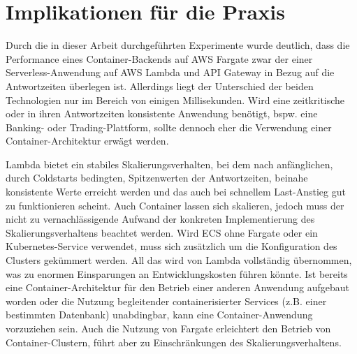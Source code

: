 \section{Implikationen für die Praxis}
Durch die in dieser Arbeit durchgeführten Experimente wurde deutlich, dass die Performance eines Container-Backends auf AWS Fargate zwar der einer Serverless-Anwendung auf AWS Lambda und API Gateway in Bezug auf die Antwortzeiten überlegen ist. Allerdings liegt der Unterschied der beiden Technologien nur im Bereich von einigen Millisekunden. Wird eine zeitkritische oder in ihren Antwortzeiten konsistente Anwendung benötigt, bspw. eine Banking- oder Trading-Plattform, sollte dennoch eher die Verwendung einer Container-Architektur erwägt werden.

Lambda bietet ein stabiles Skalierungsverhalten, bei dem nach anfänglichen, durch Coldstarts bedingten, Spitzenwerten der Antwortzeiten, beinahe konsistente Werte erreicht werden und das auch bei schnellem Last-Anstieg gut zu funktionieren scheint. Auch Container lassen sich skalieren, jedoch muss der nicht zu vernachlässigende Aufwand der konkreten Implementierung des Skalierungsverhaltens beachtet werden. Wird ECS ohne Fargate oder ein Kubernetes-Service verwendet, muss sich zusätzlich um die Konfiguration des Clusters gekümmert werden. All das wird von Lambda vollständig übernommen, was zu enormen Einsparungen an Entwicklungskosten führen könnte. Ist bereits eine Container-Architektur für den Betrieb einer anderen Anwendung aufgebaut worden oder die Nutzung begleitender containerisierter Services (z.B. einer bestimmten Datenbank) unabdingbar, kann eine Container-Anwendung vorzuziehen sein. Auch die Nutzung von Fargate erleichtert den Betrieb von Container-Clustern, führt aber zu Einschränkungen des Skalierungsverhaltens.

